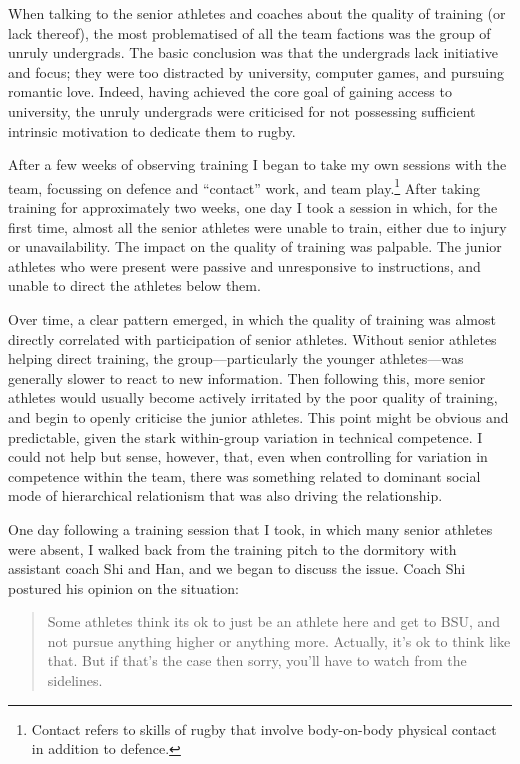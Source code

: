   When talking to the senior athletes and coaches about the quality of training (or lack thereof), the most problematised of all the team factions was the group of unruly undergrads.  The basic conclusion was that the undergrads lack initiative and focus; they were too distracted by university, computer games, and pursuing romantic love. Indeed, having achieved the core goal of gaining access to university, the unruly undergrads were criticised for not possessing sufficient intrinsic motivation to dedicate them to rugby.

  \myparagraph{}

  After a few weeks of observing training I began to take my own sessions with the team, focussing on defence and ``contact'' work, and team play.\footnote{Contact refers to skills of rugby that involve body-on-body physical contact in addition to defence.}  After taking training for approximately two weeks, one day I took a session in which, for the first time, almost all the senior athletes were unable to train, either due to injury or unavailability.  The impact on the quality of training was palpable.  The junior athletes who were present were passive and unresponsive to instructions, and unable to direct the athletes below them.

  Over time, a clear pattern emerged, in which the quality of training was almost directly correlated with participation of senior athletes. Without senior athletes helping direct training, the group---particularly the younger athletes---was generally slower to react to new information.  Then following this, more senior athletes would usually become actively irritated by the poor quality of training, and begin to openly criticise the junior athletes.  This point might be obvious and predictable, given the stark within-group variation in technical competence.  I could not help but sense, however, that, even when controlling for variation in competence within the team, there was something related to dominant social mode of hierarchical relationism that was also driving the relationship.

  One day following a training session that I took, in which many senior athletes were absent,  I walked back from the training pitch to the dormitory with assistant coach Shi and Han, and we began to discuss the issue. Coach Shi postured his opinion on the situation:

  \begin{quotation}
    Some athletes think its ok to just be an athlete here and get to BSU, and not pursue anything higher or anything more.  Actually, it's ok to think like that. But if that's the case then sorry, you'll have to watch from the sidelines.
  \end{quotation}

